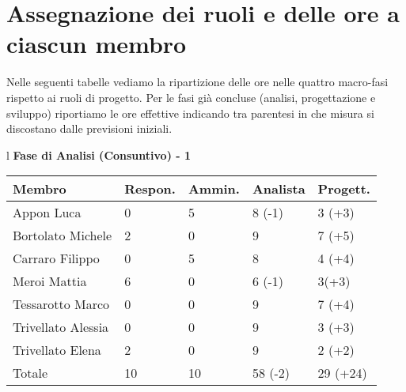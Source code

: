 \section{Assegnazione dei ruoli e delle ore a ciascun membro}
Nelle seguenti tabelle vediamo la ripartizione delle ore nelle quattro macro-fasi rispetto ai ruoli di progetto. Per le fasi gi\`a concluse (analisi, progettazione e sviluppo) riportiamo le ore effettive indicando tra parentesi in che misura si discostano dalle previsioni iniziali.
\begin{table}[hbtp]
\large{
\begin{tabular}{l}
\Large{\textbf{\textsf{Fase di Analisi (Consuntivo) - 1}}} \\
\begin{tabular}{||p{3.5cm}||p{2cm}||p{2cm}||p{2cm}||p{2cm}||}
\hline
\textbf{Membro} & \textbf{Respon.} & \textbf{Ammin.} & \textbf{Analista}

& \textbf{Progett.}\\
\hline
{Appon Luca}&0&5&8 \footnotesize{(-1)}&3 \footnotesize{(+3)} \\ 
\hline 
{Bortolato Michele} &2&0&9&7 \footnotesize{(+5)}\\ 
\hline
{Carraro Filippo}&0&5&8&4 \footnotesize{(+4)} \\
\hline
{Meroi Mattia}&6&0&6 \footnotesize{(-1)}&3\footnotesize{(+3)}\\
\hline
{Tessarotto Marco} &0&0&9&7 \footnotesize{(+4)}\\
\hline
{Trivellato Alessia} &0&0&9&3 \footnotesize{(+3)} \\
\hline
{Trivellato Elena} &2&0&9&2 \footnotesize{(+2)} \\
\hline
{Totale}& 10&10&58 \footnotesize{(-2)}&29 \footnotesize{(+24)} \\
\hline

\end{tabular} \\
\end{tabular}
}
\end{table}

